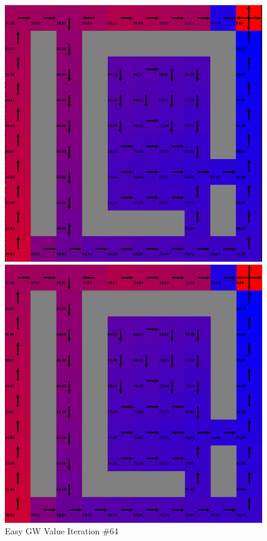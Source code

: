 \documentclass[h]{article}
\begin{document}
  \begin{figure}[H]
      \includegraphics[width=1\textwidth,keepaspectratio]{easy-value-64.png} 
      \caption*{Easy GW Value Iteration \#64} 
   \endminipage\hfill
      \includegraphics[width=1\textwidth,keepaspectratio]{easy-policy-33.png} 

\end{figure}
\end{document}
